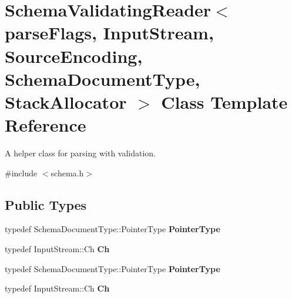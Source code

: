 \hypertarget{class_schema_validating_reader}{}\section{Schema\+Validating\+Reader$<$ parse\+Flags, Input\+Stream, Source\+Encoding, Schema\+Document\+Type, Stack\+Allocator $>$ Class Template Reference}
\label{class_schema_validating_reader}


A helper class for parsing with validation.  




{\ttfamily \#include $<$schema.\+h$>$}

\subsection*{Public Types}
\begin{DoxyCompactItemize}
\item 
typedef Schema\+Document\+Type\+::\+Pointer\+Type {\bfseries Pointer\+Type}\hypertarget{class_schema_validating_reader_a30ecf1b20ca5a1b79e0d5f4ceb3bf198}{}\label{class_schema_validating_reader_a30ecf1b20ca5a1b79e0d5f4ceb3bf198}

\item 
typedef Input\+Stream\+::\+Ch {\bfseries Ch}\hypertarget{class_schema_validating_reader_a6eb6f887a49dbb400800ab4fc01f02c7}{}\label{class_schema_validating_reader_a6eb6f887a49dbb400800ab4fc01f02c7}

\item 
typedef Schema\+Document\+Type\+::\+Pointer\+Type {\bfseries Pointer\+Type}\hypertarget{class_schema_validating_reader_a30ecf1b20ca5a1b79e0d5f4ceb3bf198}{}\label{class_schema_validating_reader_a30ecf1b20ca5a1b79e0d5f4ceb3bf198}

\item 
typedef Input\+Stream\+::\+Ch {\bfseries Ch}\hypertarget{class_schema_validating_reader_a6eb6f887a49dbb400800ab4fc01f02c7}{}\label{class_schema_validating_reader_a6eb6f887a49dbb400800ab4fc01f02c7}

\end{DoxyCompactItemize}
